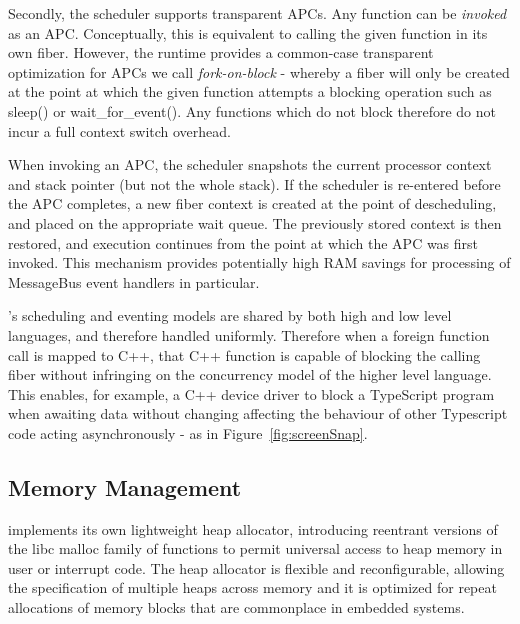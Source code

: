 Secondly, the \CO scheduler supports transparent APCs. Any function can be \emph{invoked} as an APC. Conceptually, this is equivalent to calling the given function in its own fiber. However, the \CO runtime provides a common-case transparent optimization for APCs we call \emph{fork-on-block} - whereby a fiber will only be created at the point at which the given function attempts a blocking operation such as sleep() or wait\_for\_event(). Any functions which do not block therefore do not incur a full context switch overhead.

When invoking an APC, the scheduler snapshots the current processor context and stack pointer (but not the whole stack). If the scheduler is re-entered before the APC completes, a new fiber context is created at the point of descheduling, and placed on the appropriate wait queue. The previously stored context is then restored, and execution continues from the point at which the APC was first invoked. This mechanism provides potentially high RAM savings for processing of MessageBus event handlers in particular.

\CO's scheduling and eventing models are shared by both high and low level languages, and therefore handled uniformly. Therefore when a foreign function call is mapped to C++, that C++ function is capable of blocking the calling fiber without infringing on the concurrency model of the higher level language. This enables, for example, a C++ device driver to block a TypeScript program when awaiting data without changing affecting the behaviour of other Typescript code acting asynchronously - as in Figure~\ref{fig:screenSnap}.



\subsection{Memory Management}
\CO implements its own lightweight heap allocator, introducing reentrant versions of the libc malloc family of functions to permit universal access to heap memory in user or interrupt code. The heap allocator is flexible and reconfigurable, allowing the specification of multiple heaps across memory and it is optimized for repeat allocations of memory blocks that are commonplace in embedded systems.

